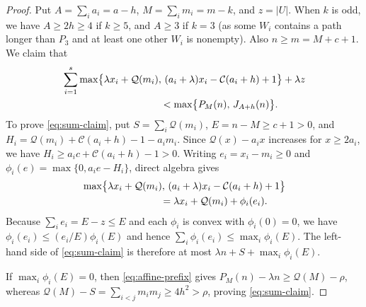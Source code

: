 \documentclass[10pt]{article}
\theoremstyle{compactplain}
\theoremstyle{remark}\newtheorem{remark}[theorem]{Remark}
\begin{document}
\begin{proof}
Put $A=\sum_i a_i=a-h$, $M=\sum_i m_i=m-k$, and $z=|U|$. When $k$ is
odd, we have $A\ge2h\ge4$ if $k\ge5$, and $A\ge3$ if $k=3$ (as some
$W_i$ contains a path longer than $P_3$ and at least one other $W_i$ is
nonempty). Also $n\ge m=M+c+1$. We claim that
\begin{align}
 &\sum_{i=1}^s\max\bigl\{\lambda x_i+\mathcal{Q}(m_i),\,
  (a_i+\lambda)x_i-\mathcal{C}(a_i+h)+1\bigr\}+\lambda z
  \notag\\
 &\hspace{35mm}<\max\bigl\{P_M(n),\,J_{A+h}(n)\bigr\}.
 \label{eq:sum-claim}
\end{align}
To prove \eqref{eq:sum-claim}, put $S=\sum_i\mathcal{Q}(m_i)$,
$E=n-M\ge c+1>0$, and
$H_i=\mathcal{Q}(m_i)+\mathcal{C}(a_i+h)-1-a_im_i$. Since
$\mathcal{Q}(x)-a_ix$ increases for $x\ge2a_i$, we have
$H_i\ge a_ic+\mathcal{C}(a_i+h)-1>0$. Writing $e_i=x_i-m_i\ge0$ and
$\phi_i(e)=\max\{0,a_ie-H_i\}$, direct algebra gives
\begin{align}
 &\max\bigl\{\lambda x_i+\mathcal{Q}(m_i),\,
  (a_i+\lambda)x_i-\mathcal{C}(a_i+h)+1\bigr\} \notag\\
 &\hspace{28mm}=\lambda x_i+\mathcal{Q}(m_i)+\phi_i(e_i).
 \label{eq:phi-identity}
\end{align}
Because $\sum_i e_i=E-z\le E$ and each $\phi_i$ is convex with
$\phi_i(0)=0$, we have $\phi_i(e_i)\le(e_i/E)\phi_i(E)$ and hence
$\sum_i\phi_i(e_i)\le\max_i\phi_i(E)$. The left-hand side of
\eqref{eq:sum-claim} is therefore at most
$\lambda n+S+\max_i\phi_i(E)$.

If $\max_i\phi_i(E)=0$, then \eqref{eq:affine-prefix} gives
$P_M(n)-\lambda n\ge\mathcal{Q}(M)-\rho$, whereas
$\mathcal{Q}(M)-S=\sum_{i<j}m_im_j\ge4h^2>\rho$, proving
\eqref{eq:sum-claim}.


\end{proof}
\end{document}
